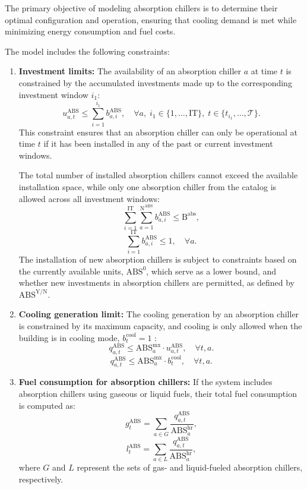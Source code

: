 \documentclass[11pt]{article}
\begin{document}
The primary objective of modeling absorption chillers is to determine their optimal configuration and operation, ensuring that cooling demand is met while minimizing energy consumption and fuel costs.

The model includes the following constraints:

\begin{enumerate}
    \item \textbf{Investment limits:}
    The availability of an absorption chiller \(a\) at time \(t\) is constrained by the accumulated investments made up to the corresponding investment window \(i_1\):
    \[
    u^\text{ABS}_{a,t} \leq \sum_{i=1}^{i_1} b^\text{ABS}_{a,i}, \quad \forall a, \; i_1 \in \{1, \dots, \text{IT}\}, \; t \in \{t_{i_1}, \dots, \mathcal{T}\}.
    \]
    This constraint ensures that an absorption chiller can only be operational at time \(t\) if it has been installed in any of the past or current investment windows.
    
    The total number of installed absorption chillers cannot exceed the available installation space, while only one absorption chiller from the catalog is allowed across all investment windows:
    \[
    \sum_{i=1}^{\text{IT}} \sum_{a=1}^{\text{N}^\text{ABS}} b^\text{ABS}_{a,i} \leq \text{B}^\text{abs},
    \]
    \[
    \sum_{i=1}^{\text{IT}} b^\text{ABS}_{a,i} \leq 1, \quad \forall a.
    \]
    The installation of new absorption chillers is subject to constraints based on the currently available units, \(\text{ABS}^\text{0}\), which serve as a lower bound, and whether new investments in absorption chillers are permitted, as defined by \(\text{ABS}^\text{Y/N}\).
    
    \item \textbf{Cooling generation limit:}
    The cooling generation by an absorption chiller is constrained by its maximum capacity, and cooling is only allowed when the building is in cooling mode, \(b^\text{cool}_t=1\) :
    \[
    q^\text{ABS}_{a,t} \leq \text{ABS}^\text{mx}_a \cdot u^\text{ABS}_{a,t}, \quad \forall t, a.
    \]
    \[
    q^\text{ABS}_{a,t} \leq \text{ABS}^\text{mx}_a \cdot b^\text{cool}_{t}, \quad \forall t, a.
    \]

    \item \textbf{Fuel consumption for absorption chillers:}
    If the system includes absorption chillers using gaseous or liquid fuels, their total fuel consumption is computed as:
    \[
    g^\text{ABS}_{t} = \sum_{a \in G} \frac{q^\text{ABS}_{a,t}}{\text{ABS}^\text{hr}_a},
    \]
    \[
    l^\text{ABS}_{t} = \sum_{a \in L} \frac{q^\text{ABS}_{a,t}}{\text{ABS}^\text{hr}_a},
    \]
    where \(G\) and \(L\) represent the sets of gas- and liquid-fueled absorption chillers, respectively.


\end{enumerate}
\end{document}
